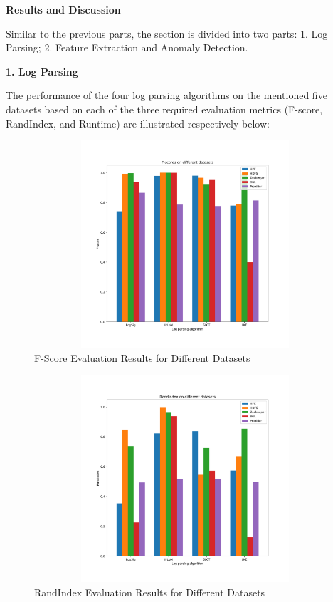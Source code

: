 \documentclass[12pt,a4paper]{article}
\begin{document}
	\noindent 
	
	\vspace{0.6cm}
	\noindent \textbf{\Large Results and Discussion}
	\vspace{0.5cm}
	
	\noindent Similar to the previous parts, the section is divided into two parts:  1. Log Parsing; 2. Feature Extraction and Anomaly Detection.
	
	\vspace{0.4cm}
	\noindent \textbf{\large 1. Log Parsing}
	\vspace{0.3cm}
	
	\noindent The performance of the four log parsing algorithms on the mentioned five datasets based on each of the three required evaluation metrics (F-score, RandIndex, and Runtime) are illustrated respectively below:
	
	\vspace{-0.5cm}
	\begin{figure}[H]
		\centering
		\includegraphics[width=13cm, height=7.7cm]{Figures/F1_1}
		\vspace{-0.8cm}
		
		\caption{F-Score Evaluation Results for Different Datasets}
	\end{figure}
	
	\vspace{-1cm}
	\begin{figure}[H]
		\centering
		\includegraphics[width=13cm, height=7.7cm]{Figures/ACC_1}
		\vspace{-0.8cm}
		
		\caption{RandIndex Evaluation Results for Different Datasets}
	\end{figure}
\end{document}
